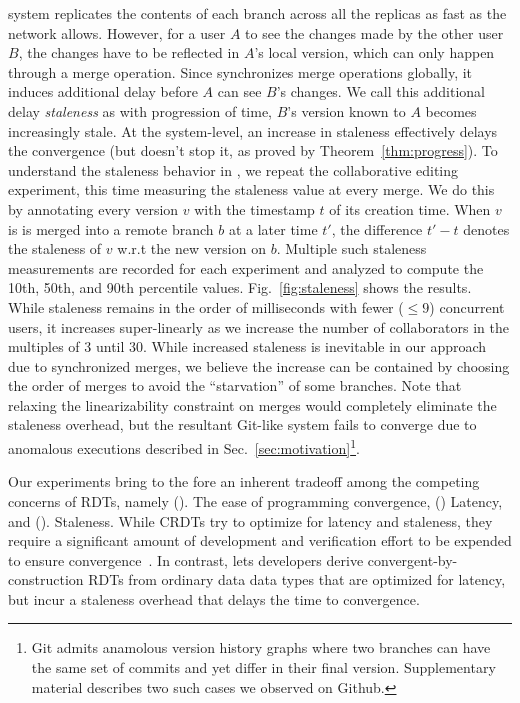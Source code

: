 \quark system replicates the contents of each branch across all the
replicas as fast as the network allows. However, for a user $A$ to
see the changes made by the other user $B$, the changes have to be
reflected in $A$'s local version, which can only happen through a
merge operation. Since \quark synchronizes merge operations globally,
it induces additional delay before $A$ can see $B$'s changes. We call
this additional delay \emph{staleness} as with progression of time,
$B$'s version known to $A$ becomes increasingly stale. At the
system-level, an increase in staleness effectively delays the
convergence (but doesn't stop it, as proved by
Theorem~\ref{thm:progress}). To understand the staleness behavior in
\quark, we repeat the collaborative editing experiment, this time
measuring the staleness value at every merge. We do this by annotating
every version $v$ with the timestamp $t$ of its creation time. When
$v$ is is merged into a remote branch $b$ at a later time $t'$, the
difference $t' - t$ denotes the staleness of $v$ w.r.t the new version
on $b$. Multiple such staleness measurements are recorded for each
experiment and analyzed to compute the 10th, 50th, and 90th percentile
values. Fig.~\ref{fig:staleness} shows the results. While
staleness remains in the order of milliseconds with fewer ($\leq 9$)
concurrent users, it increases super-linearly as we increase the
number of collaborators in the multiples of 3 until 30. While
increased staleness is inevitable in our approach due to synchronized
merges, we believe the increase can be contained by choosing the order
of merges to avoid the ``starvation'' of some branches. Note that
relaxing the linearizability constraint on merges would completely
eliminate the staleness overhead, but the resultant Git-like system
fails to converge due to anomalous executions described in
Sec.~\ref{sec:motivation}\footnote{
  Git admits anamolous version history graphs where two branches can
  have the same set of commits and yet differ in their final version.
  Supplementary material describes two such cases we observed on
  Github.}. 

Our experiments bring to the fore an inherent tradeoff among the
competing concerns of RDTs, namely (). The ease of programming
convergence, () Latency, and ().  Staleness. While CRDTs
try to optimize for latency and staleness, they require a significant
amount of development and verification effort to be expended to ensure
convergence~\cite{kleppmann2017}. In contrast, \quark lets developers
derive convergent-by-construction RDTs from ordinary data data types
that are optimized for latency, but incur a staleness overhead that
delays the time to convergence. 


